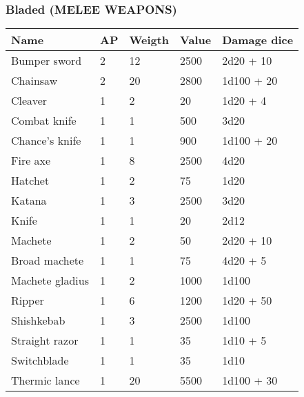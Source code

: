 
\subsubsection{Bladed (MELEE WEAPONS)}
\begin{longtable}{|p{6cm}|p{1.5cm}|p{3cm}|p{3cm}|p{4cm}|}
\hline
\bfseries Name & \bfseries AP & \bfseries Weigth & \bfseries Value & \bfseries Damage dice \\
\hline
\endhead
Bumper sword & 2 & 12 & 2500 & 2d20 + 10 \\
Chainsaw & 2 & 20 & 2800 & 1d100 + 20 \\
Cleaver & 1 & 2 & 20 & 1d20 + 4 \\
Combat knife & 1 & 1 & 500 & 3d20 \\
Chance's knife & 1 & 1 & 900 & 1d100 + 20 \\
Fire axe & 1 & 8 & 2500 & 4d20 \\
Hatchet & 1 & 2 & 75 & 1d20 \\
Katana & 1 & 3 & 2500 & 3d20 \\
Knife & 1 & 1 & 20 & 2d12 \\
Machete & 1 & 2 & 50 & 2d20 + 10 \\
Broad machete & 1 & 1 & 75 & 4d20 + 5 \\
Machete gladius & 1 & 2 & 1000 & 1d100 \\
Ripper & 1 & 6 & 1200 & 1d20 + 50 \\
Shishkebab & 1 & 3 & 2500 & 1d100 \\
Straight razor & 1 & 1 & 35 & 1d10 + 5 \\
Switchblade & 1 & 1 & 35 & 1d10 \\
Thermic lance & 1 & 20 & 5500 & 1d100 + 30 \\
\hline
\end{longtable}
